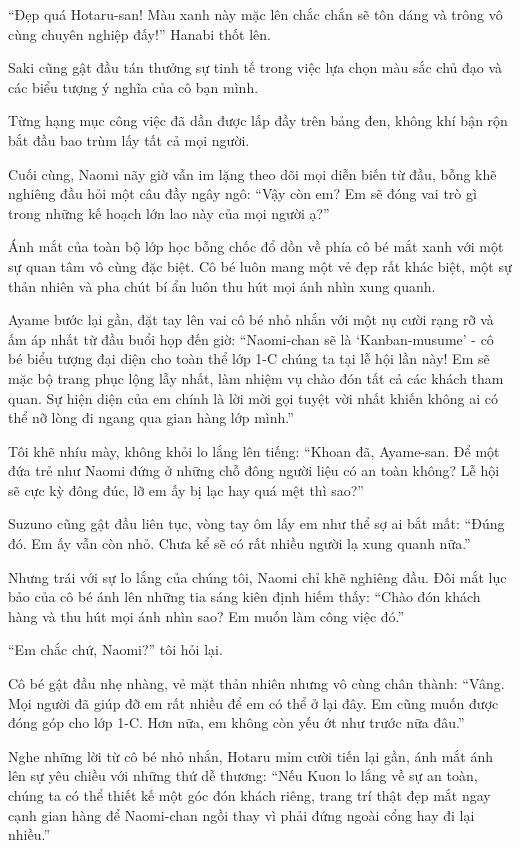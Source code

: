 \documentclass[../main.tex]{subfiles}
\begin{document}
``Đẹp quá Hotaru-san! Màu xanh này mặc lên chắc chắn sẽ tôn dáng và trông vô cùng chuyên nghiệp đấy!'' Hanabi thốt lên.

Saki cũng gật đầu tán thưởng sự tinh tế trong việc lựa chọn màu sắc chủ đạo và các biểu tượng ý nghĩa của cô bạn mình.

Từng hạng mục công việc đã dần được lấp đầy trên bảng đen, không khí bận rộn bắt đầu bao trùm lấy tất cả mọi người.

Cuối cùng, Naomi nãy giờ vẫn im lặng theo dõi mọi diễn biến từ đầu, bỗng khẽ nghiêng đầu hỏi một câu đầy ngây ngô: ``Vậy còn em? Em sẽ đóng vai trò gì trong những kế hoạch lớn lao này của mọi người ạ?''

Ánh mắt của toàn bộ lớp học bỗng chốc đổ dồn về phía cô bé mắt xanh với một sự quan tâm vô cùng đặc biệt. Cô bé luôn mang một vẻ đẹp rất khác biệt, một sự thản nhiên và pha chút bí ẩn luôn thu hút mọi ánh nhìn xung quanh.

Ayame bước lại gần, đặt tay lên vai cô bé nhỏ nhắn với một nụ cười rạng rỡ và ấm áp nhất từ đầu buổi họp đến giờ: ``Naomi-chan sẽ là `Kanban-musume' - cô bé biểu tượng đại diện cho toàn thể lớp 1-C chúng ta tại lễ hội lần này! Em sẽ mặc bộ trang phục lộng lẫy nhất, làm nhiệm vụ chào đón tất cả các khách tham quan. Sự hiện diện của em chính là lời mời gọi tuyệt vời nhất khiến không ai có thể nỡ lòng đi ngang qua gian hàng lớp mình.''

Tôi khẽ nhíu mày, không khỏi lo lắng lên tiếng: ``Khoan đã, Ayame-san. Để một đứa trẻ như Naomi đứng ở những chỗ đông người liệu có an toàn không? Lễ hội sẽ cực kỳ đông đúc, lỡ em ấy bị lạc hay quá mệt thì sao?''

Suzuno cũng gật đầu liên tục, vòng tay ôm lấy em như thể sợ ai bắt mất: ``Đúng đó. Em ấy vẫn còn nhỏ. Chưa kể sẽ có rất nhiều người lạ xung quanh nữa.''

Nhưng trái với sự lo lắng của chúng tôi, Naomi chỉ khẽ nghiêng đầu. Đôi mắt lục bảo của cô bé ánh lên những tia sáng kiên định hiếm thấy: ``Chào đón khách hàng và thu hút mọi ánh nhìn sao? Em muốn làm công việc đó.''

``Em chắc chứ, Naomi?'' tôi hỏi lại.

Cô bé gật đầu nhẹ nhàng, vẻ mặt thản nhiên nhưng vô cùng chân thành: ``Vâng. Mọi người đã giúp đỡ em rất nhiều để em có thể ở lại đây. Em cũng muốn được đóng góp cho lớp 1-C. Hơn nữa, em không còn yếu ớt như trước nữa đâu.''

Nghe những lời từ cô bé nhỏ nhắn, Hotaru mỉm cười tiến lại gần, ánh mắt ánh lên sự yêu chiều với những thứ dễ thương: ``Nếu Kuon lo lắng về sự an toàn, chúng ta có thể thiết kế một góc đón khách riêng, trang trí thật đẹp mắt ngay cạnh gian hàng để Naomi-chan ngồi thay vì phải đứng ngoài cổng hay đi lại nhiều.''
\end{document}
